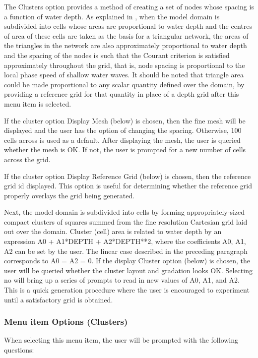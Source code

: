\documentclass{article}
\begin{document}
The Clusters option provides a method of creating a set of nodes whose spacing is a function of water depth. As explained in \cite{HW1992}, when the model domain is subdivided into cells whose areas are proportional to water depth and the centres of area of these cells are taken as the basis for a triangular network, the areas of the triangles in the network are also approximately proportional to water depth and the spacing of the nodes is such that the Courant criterion is satisfied approximately throughout the grid, that is, node spacing is proportional to the local phase speed of shallow water waves. It should be noted that triangle area could be made proportional to any scalar quantity defined over the domain, by providing a reference grid for that quantity in place of a depth grid after this menu item is selected.

If the cluster option Display Mesh (below) is chosen, then the fine mesh will be displayed and the user has the option of changing the spacing. Otherwise, 100 cells across is used as a default. After displaying the mesh, the user is queried whether the mesh is OK. If not, the user is prompted for a new number of cells across the grid.

If the cluster option Display Reference Grid (below) is chosen, then the reference grid id displayed. This option is useful for determining whether the reference grid properly overlays the grid being generated.

Next, the model domain is subdivided into cells by forming appropriately-sized compact clusters of squares summed from the fine resolution Cartesian grid laid out over the domain. Cluster (cell) area is related to water depth by an expression A0 + A1*DEPTH + A2*DEPTH**2, where the coefficients A0, A1, A2 can be set by the user. The linear case described in the preceding paragraph corresponds to A0 = A2 = 0. If the display Cluster option (below) is chosen, the user will be queried whether the cluster layout and gradation looks OK. Selecting no will bring up a series of prompts to read in new values of A0, A1, and A2. This is a quick generation procedure where the user is encouraged to experiment until a satisfactory grid is obtained.

\subsubsection[Menu item Options]{Menu item Options (Clusters)}

When selecting this menu item, the user will be prompted with the following questions:\\
\end{document}
